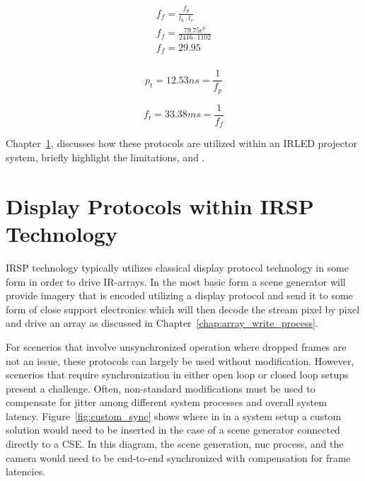    \begin{equation}
        \begin{array}{ l }
            \displaystyle f_f={\frac{f_p}{l_h \cdot l_v}} \\[11pt]
            \displaystyle f_f={\frac{79.75e^6}{2416 \cdot 1102}} \\[11pt]
            \displaystyle f_f={29.95} \\[11pt]
        \end{array}
        \label{eq:f_f_solve}
    \end{equation}

    \begin{equation}
        p_t=12.53ns={\frac{1}{f_p}}
        \label{eq:p_t_solve}
    \end{equation}

    \begin{equation}
        f_t=33.38ms={\frac{1}{f_f}}
        \label{eq:f_t_solve}
    \end{equation}

    Chapter~\ref{sec:displays_within_proj_system}, discusses how these protocols are utilized within an IRLED projector system, briefly highlight the limitations, and . %

\section{Display Protocols within IRSP Technology}
    \label{sec:displays_within_proj_system}
    IRSP technology typically utilizes classical display protocol technology in some form in order to drive IR-arrays. In the most basic form a scene generator will provide imagery that is encoded utilizing a display protocol and send it to some form of close support electronics which will then decode the stream pixel by pixel and drive an array as discussed in Chapter~\ref{chap:array_write_process}.

    For scenerios that involve unsynchronized operation where dropped frames are not an issue, these protocols can largely be used without modification. However, scenerios that require synchronization in either open loop or closed loop setups present a challenge. Often, non-standard modifications must be used to compensate for jitter among different system processes and overall system latency. Figure~\ref{fig:custom_sync} shows where in in a system setup a custom solution would need to be inserted in the case of a scene generator connected directly to a CSE. In this diagram, the scene generation, nuc process, and the camera would need to be end-to-end synchronized with compensation for frame latencies.

